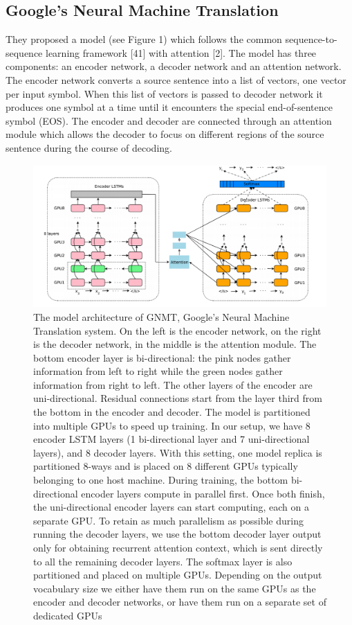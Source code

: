 \subsection{Google's Neural Machine Translation}
They proposed a model (see Figure 1) which follows the common sequence-to-sequence learning framework [41] with attention [2]. The model has three components: an encoder network, a decoder network and an attention network. The encoder network converts a source sentence into a list of vectors, one vector per input symbol. When this list of vectors is passed to decoder network it produces one symbol at a time until it encounters the special end-of-sentence symbol (EOS). The encoder and decoder are connected through an attention module which allows the decoder to focus on different regions of the source sentence during the course of decoding. 
\begin{figure}
\includegraphics[width=\textwidth]{figures/gnmt1.png}
\caption{ The model architecture of GNMT, Google’s Neural Machine Translation system. On the left
is the encoder network, on the right is the decoder network, in the middle is the attention module. The
bottom encoder layer is bi-directional: the pink nodes gather information from left to right while the green
nodes gather information from right to left. The other layers of the encoder are uni-directional. Residual
connections start from the layer third from the bottom in the encoder and decoder. The model is partitioned
into multiple GPUs to speed up training. In our setup, we have 8 encoder LSTM layers (1 bi-directional layer
and 7 uni-directional layers), and 8 decoder layers. With this setting, one model replica is partitioned 8-ways
and is placed on 8 different GPUs typically belonging to one host machine. During training, the bottom
bi-directional encoder layers compute in parallel first. Once both finish, the uni-directional encoder layers
can start computing, each on a separate GPU. To retain as much parallelism as possible during running
the decoder layers, we use the bottom decoder layer output only for obtaining recurrent attention context,
which is sent directly to all the remaining decoder layers. The softmax layer is also partitioned and placed on
multiple GPUs. Depending on the output vocabulary size we either have them run on the same GPUs as the
encoder and decoder networks, or have them run on a separate set of dedicated GPUs} \label{fig1}
\end{figure}


